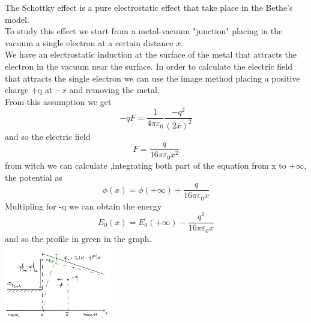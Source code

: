 The Schottky effect is a pure electrostatic effect that take place in the Bethe's model.\\
To study this effect we start from a metal-vacuum "junction" placing in the vacuum a single electron at a certain distance $\overline{x}$.\\
We have an electrostatic induction at the surface of the metal that attracts the electron in the vacuum near the surface. In order to calculate the electric field that attracts the single electron we can use the image method placing a positive charge +q at $-\overline{x}$ and removing the metal.\\
From this assumption we get 
\begin{equation}
-qF=\frac{1}{4\pi \varepsilon_0} \frac{-q^2}{(2\overline{x})^2}
\end{equation}
and so the electric field 
\begin{equation}
F=\frac{q}{16\pi\varepsilon_0x^2}
\end{equation}
from witch we can calculate ,integrating both part of the equation from x to $+\infty$, the potential as
\begin{equation}
\phi(x)=\phi(+\infty)+\frac{q}{16\pi \varepsilon_0 x}
\end{equation}
Multipling for -q we can obtain the energy 
\begin{equation}
E_0(x)=E_0(+\infty)-\frac{q^2}{16 \pi \varepsilon_0 x}
\end{equation}
and so the profile in green in the graph.\\

\centering
\includegraphics[width=0.35\textwidth]{deltaphibn.png}\\
\raggedright

